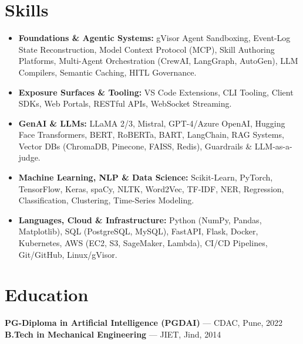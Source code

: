\documentclass[10pt,a4paper]{article}
\begin{document}
\section*{Skills}
\begin{itemize}
    \item \textbf{Foundations \& Agentic Systems:} gVisor Agent Sandboxing, Event-Log State Reconstruction, Model Context Protocol (MCP), Skill Authoring Platforms, Multi-Agent Orchestration (CrewAI, LangGraph, AutoGen), LLM Compilers, Semantic Caching, HITL Governance.
    \item \textbf{Exposure Surfaces \& Tooling:} VS Code Extensions, CLI Tooling, Client SDKs, Web Portals, RESTful APIs, WebSocket Streaming.
    \item \textbf{GenAI \& LLMs:} LLaMA 2/3, Mistral, GPT-4/Azure OpenAI, Hugging Face Transformers, BERT, RoBERTa, BART, LangChain, RAG Systems, Vector DBs (ChromaDB, Pinecone, FAISS, Redis), Guardrails \& LLM-as-a-judge.
    \item \textbf{Machine Learning, NLP \& Data Science:} Scikit-Learn, PyTorch, TensorFlow, Keras, spaCy, NLTK, Word2Vec, TF-IDF, NER, Regression, Classification, Clustering, Time-Series Modeling.
    \item \textbf{Languages, Cloud \& Infrastructure:} Python (NumPy, Pandas, Matplotlib), SQL (PostgreSQL, MySQL), FastAPI, Flask, Docker, Kubernetes, AWS (EC2, S3, SageMaker, Lambda), CI/CD Pipelines, Git/GitHub, Linux/gVisor.
\end{itemize}

\section*{Education}
\textbf{PG-Diploma in Artificial Intelligence (PGDAI)} --- CDAC, Pune, 2022\\[2pt]
\textbf{B.Tech in Mechanical Engineering} --- JIET, Jind, 2014
\end{document}
